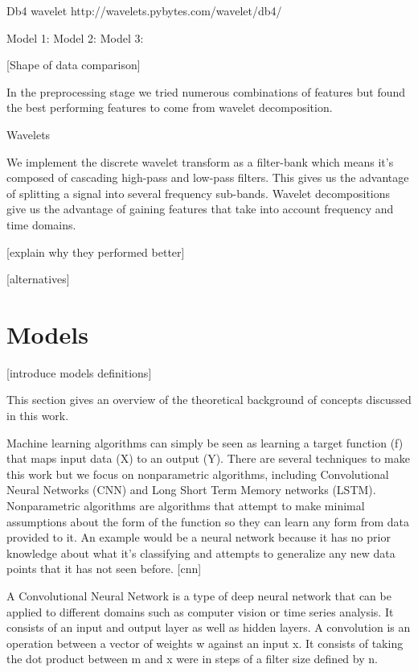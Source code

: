 \documentclass{turabian-thesis}
\begin{document}


Db4 wavelet http://wavelets.pybytes.com/wavelet/db4/

Model 1:
Model 2: 
Model 3: 



[Shape of data comparison]

In the preprocessing stage we tried numerous combinations of features but found the best performing features to come from wavelet decomposition.




Wavelets

We implement the discrete wavelet transform as a filter-bank which means it’s composed of cascading high-pass and low-pass filters. This gives us the advantage of splitting a signal into several frequency sub-bands. Wavelet decompositions give us the advantage of gaining features that take into account frequency and time domains. 

[explain why they performed better]


[alternatives]





\section{Models}
[introduce models definitions]

This section gives an overview of the theoretical background of concepts discussed in this work. 

Machine learning algorithms can simply be seen as learning a target function (f) that maps input data (X) to an output (Y). There are several techniques to make this work but we focus on nonparametric algorithms, including Convolutional Neural Networks (CNN) and Long Short Term Memory networks (LSTM). Nonparametric algorithms are algorithms that attempt to make minimal assumptions about the form of the function so they can learn any form from data provided to it. An example would be a neural network because it has no prior knowledge about what it’s classifying and attempts to generalize any new data points that it has not seen before.
[cnn]

A Convolutional Neural Network is a type of deep neural network that can be applied to different domains such as computer vision or time series analysis. It consists of an input and output layer as well as hidden layers. A convolution is an operation between a vector of weights w against an input x. It consists of taking the dot product between m and x were in steps of a filter size defined by n.
\end{document}
